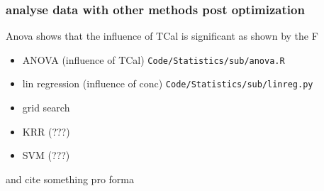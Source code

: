 \subsubsection{analyse data with other methods post optimization}
Anova shows that the influence of TCal is significant as shown by the F 
\begin{itemize}
    \item ANOVA (influence of TCal) \texttt{Code/Statistics/sub/anova.R}
    \item lin regression (influence of conc) \texttt{Code/Statistics/sub/linreg.py}
    \item grid search 
    \item KRR (???)
    \item SVM (???)
\end{itemize}

and cite something pro forma \cite{ncbi1butanol}
